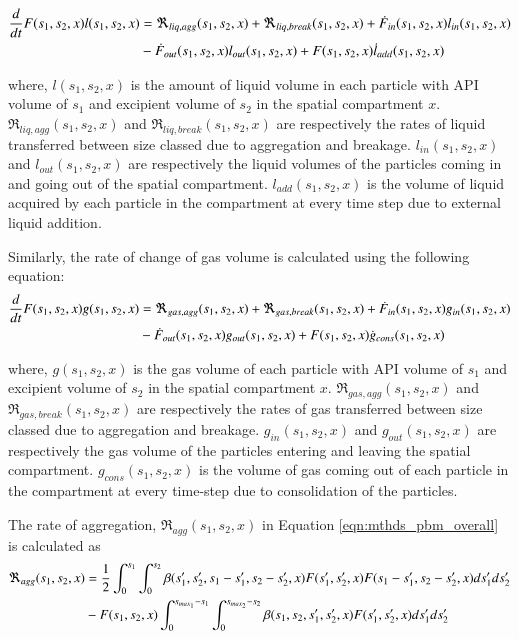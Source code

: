 \documentclass[preprint,11pt,authoryear]{elsarticle}
\begin{document}
\begin{align}
\frac{d}{dt}F(s_1,s_2,x)l(s_1,s_2,x)&= \Re_{liq,agg}(s_1,s_2,x)+\Re_{liq,break}(s_1,s_2,x)+\dot{F}_{in}(s_1,s_2,x)l_{in}(s_1,s_2,x)\notag\\
&-\dot{F}_{out}(s_1,s_2,x)l_{out}(s_1,s_2,x)+F(s_1,s_2,x)\dot{l}_{add}(s_1,s_2,x)
\end{align}

\par where, $l(s_1,s_2,x)$ is the amount of liquid volume in each particle with API volume of $s_1$ and excipient volume of $s_2$ in the spatial compartment $x$. $\Re_{liq,agg}(s_1,s_2,x)$ and $\Re_{liq,break}(s_1,s_2,x)$ are respectively the rates of liquid transferred between size classed due to aggregation and breakage. $l_{in}(s_1,s_2,x)$ and $l_{out}(s_1,s_2,x)$ are respectively the liquid volumes of the particles coming in and going out of the spatial compartment. $l_{add}(s_1,s_2,x)$ is the volume of liquid acquired by each particle in the compartment at every time step due to external liquid addition. 
\par Similarly, the rate of change of gas volume is calculated using the following equation: 
\begin{align}
\frac{d}{dt}F(s_1,s_2,x)g(s_1,s_2,x)&= \Re_{gas,agg}(s_1,s_2,x)+\Re_{gas,break}(s_1,s_2,x)+\dot{F}_{in}(s_1,s_2,x)g_{in}(s_1,s_2,x)\notag\\
&-\dot{F}_{out}(s_1,s_2,x)g_{out}(s_1,s_2,x)+F(s_1,s_2,x)\dot{g}_{cons}(s_1,s_2,x)
\end{align}

\par where, $g(s_1,s_2,x)$ is the gas volume of each particle with API volume of $s_1$ and excipient volume of $s_2$ in the spatial compartment $x$. $\Re_{gas,agg}(s_1,s_2,x)$ and $\Re_{gas,break}(s_1,s_2,x)$ are respectively the rates of gas transferred between size classed due to aggregation and breakage. $g_{in}(s_1,s_2,x)$ and $g_{out}(s_1,s_2,x)$ are respectively the gas volume of the particles entering and leaving the spatial compartment. $g_{cons}(s_1,s_2,x)$ is the volume of gas coming out of each particle in the compartment at every time-step due to consolidation of the particles. 
\par The rate of aggregation, $\Re_{agg}(s_1,s_2,x)$ in Equation \ref{eqn:mthds_pbm_overall} is calculated as  
\begin{align}
\Re_{agg}(s_1,s_2,x)&= \frac{1}{2}\int _0^{s_1} \int_0^{s_2} \beta(s_1',s_2',s_1-s_1',s_2-s_2',x)F(s_1',s_2',x)F(s_1-s_1',s_2-s_2',x)ds_1'ds_2'\notag\\ 
&- F(s_1,s_2,x)\int _0^{s_{max_1}-s_1} \int_0^{s_{max_2}-s_2} \beta(s_1,s_2,s_1',s_2',x)F(s_1',s_2',x)ds_1'ds_2'
\end{align}
\end{document}
